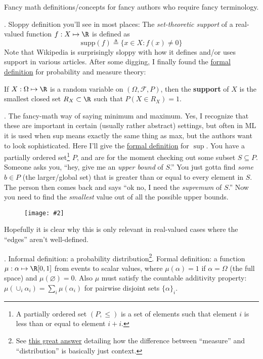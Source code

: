 \documentclass[11pt]{article}
\newcommand\myfig[2][0.3\textwidth]{\begin{figure}[h!]\centering\texttt{[image: \#2]}\end{figure}}
\begin{document}
Fancy math definitions/concepts for fancy authors who require fancy terminology.
\begin{compactitem}
	\item {}. Sloppy definition you'll see in most places: The \textit{set-theoretic support} of a real-valued function $f : X \mapsto \R$ is defined as 
	$$
		\text{supp}(f) \triangleq \{x \in X: f(x) \ne 0\}
	$$
	Note that Wikipedia is surprisingly sloppy with how it defines and/or uses support in various articles. After some digging, I finally found the \href{https://www.wikiwand.com/en/Support_(mathematics)#/In_probability_and_measure_theory}{formal definition} for probability and measure theory:
	\begin{definition}
		If $X : \Omega \mapsto \R$ is a random variable on $(\Omega, \mathcal F, P)$, then the \textbf{support} of $X$ is the smallest closed set $R_X \subset \R$ such that $P(X \in R_X) = 1$. 
	\end{definition}
	
	\item {}. The fancy-math way of saying minimum and maximum. Yes, I recognize that these are important in certain (usually rather abstract) settings, but often in ML it is used when sup means exactly the same thing as max, but the authors want to look sophisticated. Here I'll give the \href{https://www.wikiwand.com/en/Infimum_and_supremum#/Formal_definition}{formal definition} for $\sup$. You have a partially ordered set\footnote{A partially ordered set $(P, \le)$ is a set of elements such that element $i$ is less than or equal to element $i + i$.} $P$, and are for the moment checking out some subset $S \subseteq P$. Someone asks you, ``hey, give me an \textit{upper bound} of $S$.'' You just gotta find \textit{some} $b \in P$ (the larger/global set) that is greater than or equal to every element in $S$. The person then comes back and says ``ok no, I need the \textit{supremum} of $S$.'' Now you need to find the \textit{smallest} value out of all the possible upper bounds. 
	\myfig[0.5\textwidth]{figs/supremum.png}
	
	Hopefully it is clear why this is only relevant in real-valued cases where the ``edges'' aren't well-defined. 
	
	\item {}. Informal definition: a probability distribution\footnote{See \href{https://math.stackexchange.com/a/1073804}{this great answer} detailing how the difference between ``measure'' and ``distribution'' is basically just context.}. Formal definition: a function $\mu: \alpha \mapsto \R[0, 1]$ from events to scalar values, where $\mu(\alpha) = 1$ if $\alpha = \Omega$ (the full space) and $\mu(\varnothing) = 0$. Also $\mu$ must satisfy the countable additivity property: $\mu(\cup_{i} \alpha_i) = \sum_{i} \mu(\alpha_i)$ for pairwise disjoint sets $\{\alpha\}_i$. 
\end{compactitem}
\end{document}
